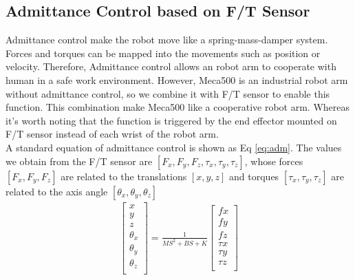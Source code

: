 \documentclass[12pt]{article}
\begin{document}
\begin{CJK}{UTF8}{bsmi}
\section{Admittance Control based on F/T Sensor}
Admittance control make the robot move like a spring-mass-damper system. Forces and torques can be mapped into the movements such as position or velocity. Therefore, Admittance control allows an robot arm to cooperate with human in a safe work environment. However, Meca500 is an industrial robot arm without admittance control, so we combine it with F/T sensor to enable this function. This combination make Meca500 like a cooperative robot arm. Whereas it's worth noting that the function is triggered by the end effector mounted on F/T sensor instead of each wrist of the robot arm.\\
A standard equation of admittance control is shown as Eq \ref{eq:adm}. The values we obtain from the F/T sensor are $\left[F_x, F_y, F_z,\tau _x, \tau _y, \tau _z \right]$, whose forces $ \left[F_x, F_y, F_z\right]$ are related to the translations $ \left[x, y, z\right]$ and torques $ \left[\tau _x, \tau _y, \tau _z\right]$ are related to the axis angle $ \left[\theta _x,\theta _y,\theta _z\right]$
\begin{equation}
\label{eq:adm}
\begin{split}
\begin{bmatrix}
x \\
y \\
z \\
\theta _x \\
\theta _y \\
\theta _z \\
\end{bmatrix}
=
\frac{1}{MS^2+BS+K}
\begin{bmatrix}
fx \\
fy \\
fz \\
\tau x \\
\tau y \\
\tau z \\
\end{bmatrix}
\end{split}
\end{equation}


\end{CJK}
\end{document}
